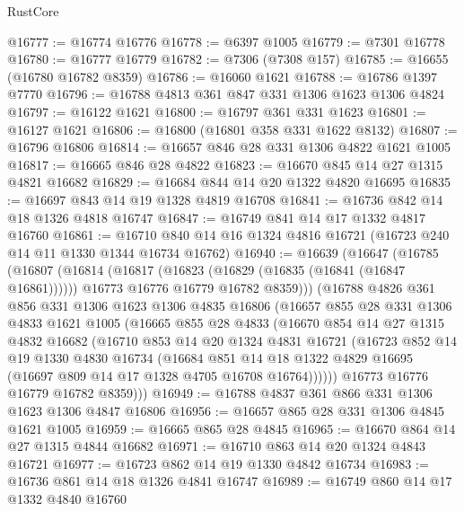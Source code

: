 \begin{lexlean}{RustCore}
\begin{coremodule}
@16777 := @16774 @16776
@16778 := @6397 @1005
@16779 := @7301 @16778
@16780 := @16777 @16779
@16782 := @7306 (@7308 @157)
@16785 := @16655 (@16780 @16782 @8359)
@16786 := @16060 @1621
@16788 := @16786 @1397 @7770
@16796 := @16788 @4813 @361 @847 @331 @1306 @1623 @1306 @4824
@16797 := @16122 @1621
@16800 := @16797 @361 @331 @1623
@16801 := @16127 @1621
@16806 := @16800 (@16801 @358 @331 @1622 @8132)
@16807 := @16796 @16806
@16814 := @16657 @846 @28 @331 @1306 @4822 @1621 @1005
@16817 := @16665 @846 @28 @4822
@16823 := @16670 @845 @14 @27 @1315 @4821 @16682
@16829 := @16684 @844 @14 @20 @1322 @4820 @16695
@16835 := @16697 @843 @14 @19 @1328 @4819 @16708
@16841 := @16736 @842 @14 @18 @1326 @4818 @16747
@16847 := @16749 @841 @14 @17 @1332 @4817 @16760
@16861 := @16710 @840 @14 @16 @1324 @4816 @16721 (@16723 @240 @14 @11 @1330 @1344 @16734 @16762)
@16940 := @16639
    (@16647
      (@16785
        (@16807
          (@16814
            (@16817 (@16823 (@16829 (@16835 (@16841 (@16847 @16861))))))
            @16773
            @16776
            @16779
            @16782
            @8359)))
      (@16788
        @4826
        @361
        @856
        @331
        @1306
        @1623
        @1306
        @4835
        @16806
        (@16657
          @855
          @28
          @331
          @1306
          @4833
          @1621
          @1005
          (@16665
            @855
            @28
            @4833
            (@16670
              @854
              @14
              @27
              @1315
              @4832
              @16682
              (@16710
                @853
                @14
                @20
                @1324
                @4831
                @16721
                (@16723
                  @852
                  @14
                  @19
                  @1330
                  @4830
                  @16734
                  (@16684
                    @851
                    @14
                    @18
                    @1322
                    @4829
                    @16695
                    (@16697 @809 @14 @17 @1328 @4705 @16708 @16764))))))
          @16773
          @16776
          @16779
          @16782
          @8359)))
@16949 := @16788 @4837 @361 @866 @331 @1306 @1623 @1306 @4847 @16806
@16956 := @16657 @865 @28 @331 @1306 @4845 @1621 @1005
@16959 := @16665 @865 @28 @4845
@16965 := @16670 @864 @14 @27 @1315 @4844 @16682
@16971 := @16710 @863 @14 @20 @1324 @4843 @16721
@16977 := @16723 @862 @14 @19 @1330 @4842 @16734
@16983 := @16736 @861 @14 @18 @1326 @4841 @16747
@16989 := @16749 @860 @14 @17 @1332 @4840 @16760

\end{coremodule}
\end{lexlean}
